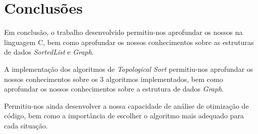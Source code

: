 
\chapter{Conclusões}
\label{ch:conclusoes}

Em conclusão, o trabalho desenvolvido permitiu-nos aprofundar os nossos na linguagem C, bem como aprofundar os nossos conhecimentos sobre as estruturas de dados \textit{SortedList} e \textit{Graph}.

A implementação dos algoritmos de \textit{Topological Sort} permitiu-nos aprofundar os nossos conhecimentos sobre os 3 algoritmos implementados, bem como aprofundar os nossos conhecimentos sobre a estrutura de dados \textit{Graph}.

Permitiu-nos ainda desenvolver a nossa capacidade de análise de otimização de código, bem como a importância de escolher o algoritmo mais adequado para cada situação.
